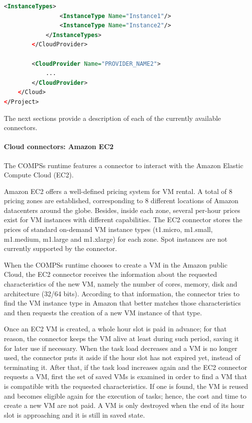 \begin{lstlisting}[language=xml]
            <InstanceTypes>
                <InstanceType Name="Instance1"/>
                <InstanceType Name="Instance2"/>
            </InstanceTypes>
        </CloudProvider>
        
        <CloudProvider Name="PROVIDER_NAME2">
            ...
        </CloudProvider>
    </Cloud>
</Project>
\end{lstlisting}

The next sections provide a description of each of the currently available connectors.

\paragraph{Cloud connectors: Amazon EC2}
The COMPSs runtime features a connector to interact with the Amazon Elastic Compute Cloud (EC2).

Amazon EC2 offers a well-defined pricing system for VM rental. A total of 8 pricing zones are 
established, corresponding to 8 different locations of Amazon datacenters around the globe. 
Besides, inside each zone, several per-hour prices exist for VM instances with different capabilities. 
The EC2 connector stores the prices of standard on-demand VM instance types (t1.micro, m1.small, 
m1.medium, m1.large and m1.xlarge) for each zone. Spot instances are not currently supported by the connector.

When the COMPSs runtime chooses to create a VM in the Amazon public Cloud, the EC2 connector receives 
the information about the requested characteristics of the new VM, namely the number of cores, memory, 
disk and architecture (32/64 bits). According to that information, the connector tries to find the VM 
instance type in Amazon that better matches those characteristics and then requests the creation of a 
new VM instance of that type.

Once an EC2 VM is created, a whole hour slot is paid in advance; for that reason, the connector keeps 
the VM alive at least during such period, saving it for later use if necessary. When the task load 
decreases and a VM is no longer used, the connector puts it aside if the hour slot has not expired yet, 
instead of terminating it. After that, if the task load increases again and the EC2 connector requests 
a VM, first the set of saved VMs is examined in order to find a VM that is compatible with the requested 
characteristics. If one is found, the VM is reused and becomes eligible again for the execution of tasks; 
hence, the cost and time to create a new VM are not paid. A VM is only destroyed when the end of its hour 
slot is approaching and it is still in saved state.

